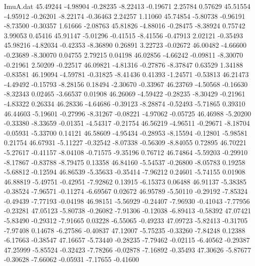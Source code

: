 \begin{filecontents}{ImuA.dat}
  45.49244   -4.98904   -0.28235   -8.22413   -0.19671    2.25784    0.57629
  45.51554   -4.95912   -0.26201   -8.22174   -0.36463    2.24257    1.11060
  45.74854   -5.80738   -0.96191   -8.73500   -0.30357    1.61666   -2.08763
  45.81826   -4.88016   -0.28475   -8.38924    0.75742    3.99053    0.45416
  45.91147   -5.01296   -0.41515   -8.41556   -0.47913    2.02121   -0.35493
  45.98216   -4.82034   -0.42353   -8.36890    0.26891    3.22723   -0.02672
  46.00482   -4.66600   -0.23689   -8.30070    0.04755    2.79215    0.04198
  46.02856   -4.66242   -0.09811   -8.30070   -0.21961    2.50209   -0.22517
  46.09821   -4.81316   -0.27876   -8.37847    0.63529    1.34188   -0.83581
  46.19094   -4.59781   -0.31825   -8.41436    0.41393   -1.24571   -0.53813
  46.21473   -4.49492   -0.15793   -8.28156    0.18494   -2.30670   -0.33967
  46.23769   -4.50568   -0.16630   -8.32343    0.02465   -3.66537    0.01908
  46.26069   -4.59422   -0.28235   -8.30429   -0.21961   -4.83322    0.26334
  46.28336   -4.64686   -0.39123   -8.28874   -0.52493   -5.71865    0.39310
  46.44603   -5.19601   -0.27996   -8.31267   -0.08221   -4.97062   -0.05725
  46.46988   -5.20200   -0.33380   -8.33659   -0.01351   -4.54317   -0.21754
  46.56219   -4.96511   -0.29671   -8.18704   -0.05931   -5.33700    0.14121
  46.58609   -4.95434   -0.28953   -8.15594   -0.12801   -5.98581    0.21754
  46.67931   -5.11227   -0.32542   -8.07338   -0.56309   -8.84055    0.72895
  46.70221   -5.27617   -0.41157   -8.04108   -0.71575   -9.35196    0.76712
  46.74864   -5.59203   -0.29910   -8.17867   -0.83788   -8.79475    0.13358
  46.84160   -5.54537   -0.26800   -8.05783    0.19258   -5.68812   -0.12594
  46.86539   -5.35633   -0.35414   -7.96212    0.24601   -5.74155    0.01908
  46.88819   -5.49751   -0.42951   -7.92862    0.13915   -6.15373    0.06488
  46.91137   -5.38385   -0.38524   -7.96571   -0.11274   -6.69567    0.02672
  46.95789   -5.50110   -0.29192   -7.85324   -0.49439   -7.77193   -0.04198
  46.98151   -5.56929   -0.24407   -7.96930   -0.41043   -7.77956   -0.23281
  47.05123   -5.80738   -0.26082   -7.91306   -0.12038   -6.89413   -0.58392
  47.07421   -5.83490   -0.29312   -7.91665    0.03228   -6.55065   -0.49233
  47.09723   -5.82413   -0.31705   -7.97408    0.14678   -6.27586   -0.40837
  47.12007   -5.75235   -0.33260   -7.84248    0.12388   -6.17663   -0.38547
  47.16657   -5.73440   -0.28235   -7.79462   -0.02115   -6.40562   -0.29387
  47.25999   -5.85524   -0.32423   -7.78266   -0.02878   -7.16892   -0.35493
  47.30626   -5.87677   -0.30628   -7.66062   -0.05931   -7.17655   -0.41600

\end{filecontents}
